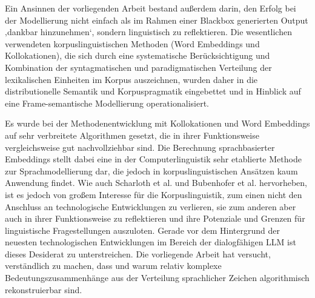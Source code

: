 Ein Ansinnen der vorliegenden Arbeit bestand außerdem darin, den Erfolg bei der Modellierung nicht einfach als im Rahmen einer Blackbox generierten Output ‚dankbar hinzunehmen`, sondern linguistisch zu reflektieren. Die wesentlichen verwendeten korpuslinguistischen Methoden (Word Embeddings und Kollokationen), die sich durch eine systematische Berücksichtigung und Kombination der syntagmatischen und paradigmatischen Verteilung der lexikalischen Einheiten im Korpus auszeichnen, wurden daher in die distributionelle Semantik und Korpuspragmatik eingebettet und in Hinblick auf eine Frame-semantische Modellierung operationalisiert.

Es wurde bei der Methodenentwicklung mit Kollokationen und Word Embeddings auf sehr verbreitete Algorithmen gesetzt, die in ihrer Funktionsweise vergleichsweise gut nachvollziehbar sind. Die Berechnung sprachbasierter Embeddings stellt dabei eine in der Computerlinguistik sehr etablierte Methode zur Sprachmodellierung dar, die jedoch in korpuslinguistischen Ansätzen kaum Anwendung findet. Wie auch Scharloth et al. \autocite*{scharlothWuchernRhizomeLinguistische2013} und Bubenhofer et al. \autocite*{bubenhoferDigitaleKulturlinguistikDigitalitaet2022} hervorheben, ist es jedoch von großem Interesse für die Korpuslinguistik, zum einen nicht den Anschluss an technologische Entwicklungen zu verlieren, sie zum anderen aber auch in ihrer Funktionsweise zu reflektieren und ihre Potenziale und Grenzen für linguistische Fragestellungen auszuloten. Gerade vor dem Hintergrund der neuesten technologischen Entwicklungen im Bereich der dialogfähigen LLM ist dieses Desiderat zu unterstreichen. Die vorliegende Arbeit hat versucht, verständlich zu machen, dass und warum relativ komplexe Bedeutungszusammenhänge aus der Verteilung sprachlicher Zeichen algorithmisch rekonstruierbar sind.

